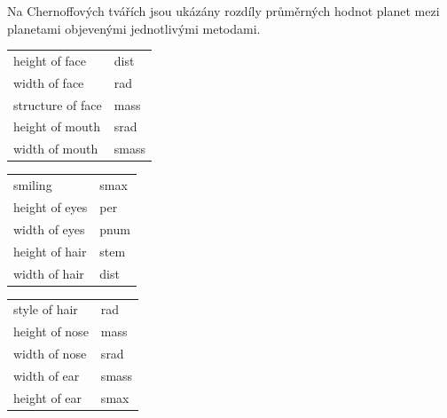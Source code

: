 \documentclass[a4paper,12pt]{article}
\begin{document}
Na Chernoffových tvářích jsou ukázány rozdíly průměrných hodnot planet mezi planetami objevenými jednotlivými metodami.

\setlength{\columnsep}{0\textwidth}
\begin{center}
\begin{multicols}{3}
\begin{minipage}{\columnwidth}
\begin{tabular}{| l| l|}
  \hline
{\cellcolor[rgb]{0.85, 0.85, 0.85}{ modified.item }} & {\cellcolor[rgb]{0.85, 0.85, 0.85}{ Var }} \\ 
  \hline
height of face    & dist \\ 
   \hline
width of face     & rad \\ 
   \hline
structure of face & mass \\ 
   \hline
height of mouth   & srad \\ 
   \hline
width of mouth    & smass \\ 
   \hline
\end{tabular}\end{minipage}
\begin{minipage}{\columnwidth}
\begin{tabular}{| l| l|}
  \hline
{\cellcolor[rgb]{0.85, 0.85, 0.85}{ modified.item }} & {\cellcolor[rgb]{0.85, 0.85, 0.85}{ Var }} \\ 
  \hline
smiling           & smax \\ 
   \hline
height of eyes    & per \\ 
   \hline
width of eyes     & pnum \\ 
   \hline
height of hair    & stem \\ 
   \hline
width of hair    & dist \\ 
   \hline
\end{tabular}\end{minipage}
\begin{minipage}{\columnwidth}
\begin{tabular}{| l| l|}
  \hline
{\cellcolor[rgb]{0.85, 0.85, 0.85}{ modified.item }} & {\cellcolor[rgb]{0.85, 0.85, 0.85}{ Var }} \\ 
  \hline
style of hair    & rad \\ 
   \hline
height of nose   & mass \\ 
   \hline
width of nose    & srad \\ 
   \hline
width of ear     & smass \\ 
   \hline
height of ear    & smax \\ 
   \hline
\end{tabular}\end{minipage}
\end{multicols}
\end{center}
\end{document}
